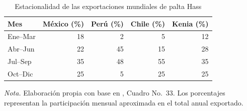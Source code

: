 \begin{table}[H]
\centering
\caption{Estacionalidad de las exportaciones mundiales de palta Hass}
\label{tab:estacionalidad_export}
\small
\begin{tabular}{lrrrr}
\toprule
\textbf{Mes} & \textbf{M\'exico (\%)} & \textbf{Per\'u (\%)} & \textbf{Chile (\%)} & \textbf{Kenia (\%)} \\
\midrule
Ene--Mar & 18 &  2 &  5 & 12 \\
Abr--Jun & 22 & 45 & 15 & 28 \\
Jul--Sep & 35 & 48 & 55 & 35 \\
Oct--Dic & 25 &  5 & 25 & 25 \\
\bottomrule
\end{tabular}
\parbox{0.94\textwidth}{\small \textit{Nota.} Elaboraci\'on propia con base en \citep{SierraSelva2020}, Cuadro No.~33. Los porcentajes representan la participaci\'on mensual aproximada en el total anual exportado.}
\end{table}
